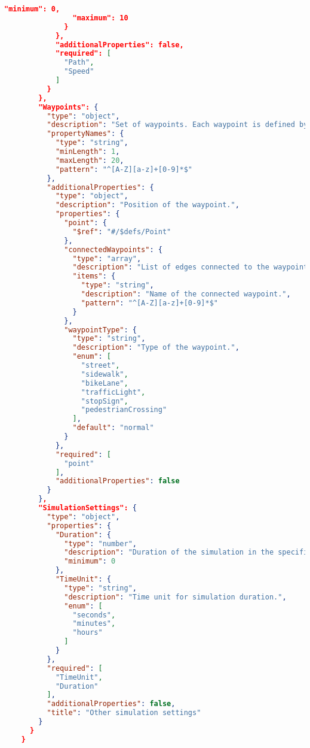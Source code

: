 \begin{lstlisting}[language=json,firstnumber=1]
                "minimum": 0,
                "maximum": 10
              }
            },
            "additionalProperties": false,
            "required": [
              "Path",
              "Speed"
            ]
          }
        },
        "Waypoints": {
          "type": "object",
          "description": "Set of waypoints. Each waypoint is defined by a name and a position. The name must consist of a capital letter followed by at least one lowercase letter and optionally a number.",
          "propertyNames": {
            "type": "string",
            "minLength": 1,
            "maxLength": 20,
            "pattern": "^[A-Z][a-z]+[0-9]*$"
          },
          "additionalProperties": {
            "type": "object",
            "description": "Position of the waypoint.",
            "properties": {
              "point": {
                "$ref": "#/$defs/Point"
              },
              "connectedWaypoints": {
                "type": "array",
                "description": "List of edges connected to the waypoint.",
                "items": {
                  "type": "string",
                  "description": "Name of the connected waypoint.",
                  "pattern": "^[A-Z][a-z]+[0-9]*$"
                }
              },
              "waypointType": {
                "type": "string",
                "description": "Type of the waypoint.",
                "enum": [
                  "street",
                  "sidewalk",
                  "bikeLane",
                  "trafficLight",
                  "stopSign",
                  "pedestrianCrossing"
                ],
                "default": "normal"
              }
            },
            "required": [
              "point"
            ],
            "additionalProperties": false
          }
        },
        "SimulationSettings": {
          "type": "object",
          "properties": {
            "Duration": {
              "type": "number",
              "description": "Duration of the simulation in the specified time unit.",
              "minimum": 0
            },
            "TimeUnit": {
              "type": "string",
              "description": "Time unit for simulation duration.",
              "enum": [
                "seconds",
                "minutes",
                "hours"
              ]
            }
          },
          "required": [
            "TimeUnit",
            "Duration"
          ],
          "additionalProperties": false,
          "title": "Other simulation settings"
        }
      }
    }
\end{lstlisting}
